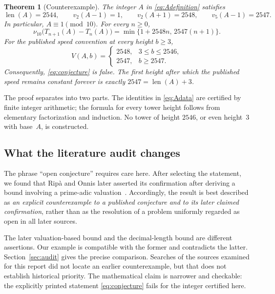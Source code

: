 \documentclass[11pt,a4paper]{article}
\newtheorem{theorem}{Theorem}[section]
\theoremstyle{definition}
\theoremstyle{remark}
\newcommand{\len}{\operatorname{len}}
\begin{document}
\begin{theorem}[Counterexample]\label{thm:main}
The integer $A$ in \eqref{eq:Adefinition} satisfies
\begin{equation}\label{eq:Adata}
 \len(A)=2544,\qquad
 v_2(A-1)=1,\qquad v_2(A+1)=2548,\qquad v_5(A-1)=2547.
\end{equation}
In particular, $A\equiv1\pmod{10}$. For every $n\ge0$,
\begin{equation}\label{eq:Asn}
 \nu_{10}\bigl(T_{n+1}(A)-T_n(A)\bigr)
 =\min\{1+2548n,\,2547(n+1)\}.
\end{equation}
For the published speed convention at every height $b\ge3$,
\begin{equation}\label{eq:Aspeed}
 V(A,b)=
 \begin{cases}
 2548,&3\le b\le2546,\\
 2547,&b\ge2547.
 \end{cases}
\end{equation}
Consequently, \eqref{eq:conjecture} is false. The first height after which the published speed remains constant forever is exactly $2547=\len(A)+3$.
\end{theorem}

The proof separates into two parts. The identities in \eqref{eq:Adata} are certified by finite integer arithmetic; the formula for every tower height follows from elementary factorization and induction. No tower of height $2546$, or even height~$3$ with base~$A$, is constructed.

\subsection{What the literature audit changes}
The phrase ``open conjecture'' requires care here. After selecting the statement, we found that Rip\`a and Onnis later asserted its confirmation after deriving a bound involving a prime-adic valuation~\cite[arXiv version, p.~10]{RipaOnnis2022}. Accordingly, the result is best described as \emph{an explicit counterexample to a published conjecture and to its later claimed confirmation}, rather than as the resolution of a problem uniformly regarded as open in all later sources.

The later valuation-based bound and the decimal-length bound are different assertions. Our example is compatible with the former and contradicts the latter. Section~\ref{sec:audit} gives the precise comparison. Searches of the sources examined for this report did not locate an earlier counterexample, but that does not establish historical priority. The mathematical claim is narrower and checkable: the explicitly printed statement \eqref{eq:conjecture} fails for the integer certified here.
\end{document}
